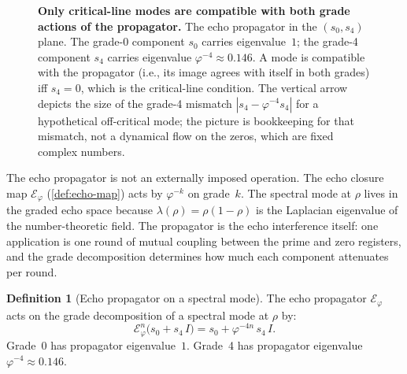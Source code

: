 \documentclass[11pt,a4paper]{article}
\theoremstyle{plain}
\theoremstyle{definition}
\newtheorem{definition}[theorem]{Definition}
\theoremstyle{remark}
\numberwithin{equation}{section}
\newcommand{\vp}{\varphi}
\begin{document}
\begin{figure}[ht]
\centering
{}
\caption{\textbf{Only critical-line modes are compatible with both grade
actions of the propagator.}
The echo propagator in the \((s_0, s_4)\) plane.
The grade-0 component \(s_0\) carries eigenvalue~\(1\); the grade-4
component \(s_4\) carries eigenvalue \(\vp^{-4}\approx0.146\).
A mode is compatible with the propagator (i.e., its image agrees with
itself in both grades) iff \(s_4=0\), which is the critical-line
condition.  The vertical arrow depicts the size of the grade-4
mismatch \(|s_4-\vp^{-4}s_4|\) for a hypothetical off-critical mode;
the picture is bookkeeping for that mismatch, not a dynamical flow on
the zeros, which are fixed complex numbers.}
\label{fig:propagator-orbit}
\end{figure}

The echo propagator is not an externally imposed operation.  The
echo closure map \(\mathcal{E}_\vp\) (\cref{def:echo-map}) acts by
\(\vp^{-k}\) on grade~\(k\).  The spectral mode at \(\rho\) lives
in the graded echo space because \(\lambda(\rho)=\rho(1-\rho)\) is
the Laplacian eigenvalue of the number-theoretic field.  The
propagator is the echo interference itself: one application is one
round of mutual coupling between the prime and zero registers, and
the grade decomposition determines how much each component
attenuates per round.

\begin{definition}[Echo propagator on a spectral mode]
\label{def:echo-propagator}
The echo propagator \(\mathcal{E}_\vp\) acts on the grade
decomposition of a spectral mode at \(\rho\) by:
\[
  \mathcal{E}_\vp^n\bigl(s_0+s_4\,I\bigr)
  =s_0+\vp^{-4n}\,s_4\,I.
\]
Grade~0 has propagator eigenvalue~\(1\).
Grade~4 has propagator eigenvalue \(\vp^{-4}\approx0.146\).
\end{definition}
\end{document}
